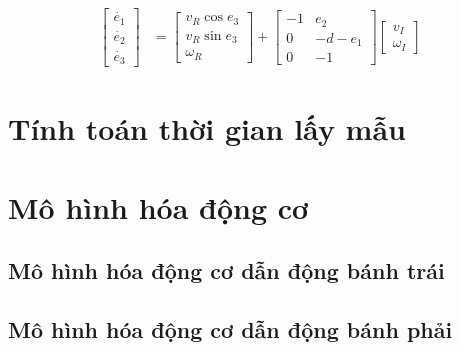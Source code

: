           \begin{align}
               \begin{bmatrix}
                    \dot{e_1} \\
                    \dot{e_2} \\
                    \dot{e_3}
                    \end{bmatrix} &= \begin{bmatrix}
                    v_R \cos e_3 \\
                    v_R \sin e_3 \\
                    \omega_R
                    \end{bmatrix} + \begin{bmatrix}
                    -1 & e_2 \\
                    0 & -d - e_1 \\
                    0 & -1
                    \end{bmatrix} \begin{bmatrix}
                    v_I \\
                    \omega_I
               \end{bmatrix}
               \label{c5_e7}
          \end{align}       
     \section{Tính toán thời gian lấy mẫu}
     \section{Mô hình hóa động cơ}
          \subsection{Mô hình hóa động cơ dẫn động bánh trái}    
          \subsection{Mô hình hóa động cơ dẫn động bánh phải}

     




          


